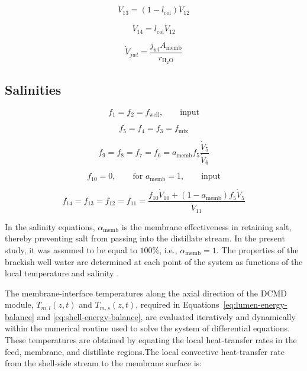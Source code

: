 \documentclass[14pt,letterpaper,fleqn]{extarticle}
\begin{document}
\begin{equation}
\dot{V}_{13}
=
\left(
1-l_{\mathrm{col}}
\right)
\dot{V}_{12}
\label{eq:V13}
\end{equation}

\begin{equation}
\dot{V}_{14}
=
l_{\mathrm{col}}\dot{V}_{12}
\label{eq:V14}
\end{equation}

\begin{equation}
\dot{V}_{jwl}
=
\frac{
j_{wl}A_{\mathrm{memb}}
}{
r_{\mathrm{H_2O}}
}
\label{eq:Vjwl}
\end{equation}

\subsection*{Salinities}

\begin{equation}
f_1
=
f_2
=
f_{\mathrm{well}},
\qquad
\text{input}
\label{eq:f1-f2}
\end{equation}

\begin{equation}
f_5
=
f_4
=
f_3
=
f_{\mathrm{mix}}
\label{eq:f3-f5}
\end{equation}

\begin{equation}
f_9
=
f_8
=
f_7
=
f_6
=
a_{\mathrm{memb}}
f_5
\frac{\dot{V}_5}{\dot{V}_6}
\label{eq:f6-f9}
\end{equation}

\begin{equation}
f_{10}
=
0,
\qquad
\text{for }
a_{\mathrm{memb}}=1,
\qquad
\text{input}
\label{eq:f10}
\end{equation}

\begin{equation}
f_{14}
=
f_{13}
=
f_{12}
=
f_{11}
=
\frac{
f_{10}\dot{V}_{10}
+
\left(
1-a_{\mathrm{memb}}
\right)
f_5\dot{V}_5
}{
\dot{V}_{11}
}
\label{eq:f11-f14}
\end{equation}


In the salinity equations, $\alpha_{\mathrm{memb}}$ is the membrane effectiveness
in retaining salt, thereby preventing salt from passing into the distillate stream. 
In the present study, it was assumed to be equal to \(100\%\), i.e., $\alpha_{\mathrm{memb}} = 1$. 
The properties of the brackish well water are determined at each point of the system as functions of
the local temperature and salinity \citep{Sparrow2003}.

The membrane-interface temperatures along the axial direction of the DCMD
module, $T_{m,l}(z,t)$ and $T_{m,s}(z,t)$, required in
Equations~\eqref{eq:lumen-energy-balance} and
\eqref{eq:shell-energy-balance}, are evaluated iteratively and dynamically
within the numerical routine used to solve the system of differential
equations. These temperatures are obtained by equating the local heat-transfer
rates in the feed, membrane, and distillate regions.The local convective heat-transfer 
rate from the shell-side stream to the membrane surface is:
\end{document}
